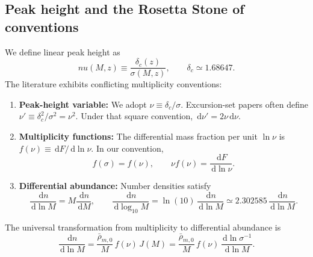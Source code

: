 \documentclass[11pt]{article}
\newcommand{\dd}{\,\mathrm d}
\newcommand{\rhobar}{\bar{\rho}_{m,0}}
\begin{document}
\subsection{Peak height and the Rosetta Stone of conventions}
We define linear peak height as
\begin{equation}
\boxed{nu(M, z) \equiv \frac{\delta_c(z)}{\sigma(M, z)}}, \qquad \delta_c \simeq 1.68647.
\end{equation}
The literature exhibits conflicting multiplicity conventions:
\begin{enumerate}[label=(\roman*)]
\item \textbf{Peak-height variable:} We adopt $\nu \equiv \delta_c / \sigma$. Excursion-set papers \cite{ShethTormen1999} often define $\nu' \equiv \delta_c^2 / \sigma^2 = \nu^2$. Under that square convention, $\dd\nu' = 2\nu\dd\nu$.
\item \textbf{Multiplicity functions:} The differential mass fraction per unit $\ln\nu$ is $f(\nu) \equiv \dd F/\dd\ln\nu$. In our convention,
\begin{equation}
f(\sigma) = f(\nu), \qquad \nu f(\nu) = \frac{\dd F}{\dd\ln\nu}.
\end{equation}
\item \textbf{Differential abundance:} Number densities satisfy
\begin{equation}
\frac{\dd n}{\dd\ln M} = M\frac{\dd n}{\dd M}, \qquad \frac{\dd n}{\dd\log_{10} M} = \ln(10)\,\frac{\dd n}{\dd\ln M} \simeq 2.302585\,\frac{\dd n}{\dd\ln M}.
\end{equation}
\end{enumerate}
The universal transformation from multiplicity to differential abundance is
\begin{equation}
\boxed{\frac{\dd n}{\dd\ln M} = \frac{\rhobar}{M}\,f(\nu)\,J(M) = \frac{\rhobar}{M}\,f(\nu)\,\frac{\dd\ln\sigma^{-1}}{\dd\ln M}}.
\label{eq:hmf_master}
\end{equation}
\end{document}
